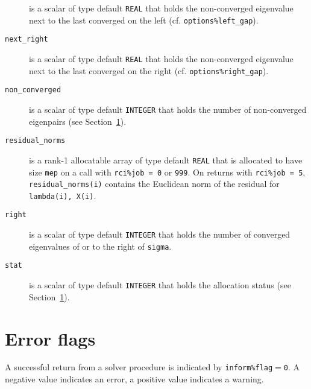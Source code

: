 \begin{description}
is a scalar of type default {\tt REAL} that holds
the non-converged eigenvalue next to the last converged on the left
(cf. {\tt options\%left\_gap}).
%
\item[\texttt{next\_right}]
is a scalar of type default {\tt REAL} that holds
the non-converged eigenvalue next to the last converged on the right
(cf. {\tt options\%right\_gap}).
%
\item[\texttt{non\_converged}]
is a scalar of type default \texttt{INTEGER}
that holds the number of non-converged eigenpairs
(see Section~\ref{ssmfe_expert:errors}).
%
\item[\texttt{residual\_norms}] is a rank-1 allocatable array of type
default {\tt REAL} that is allocated to have size {\tt mep} 
on a call with {\tt rci\%job = 0} or {\tt 999}.
On returns with 
{\tt rci\%job = 5},
{\tt residual\_norms(i)} 
contains the Euclidean norm of the residual
for {\tt lambda(i), X(i)}.
%
\item[\texttt{right}]
is a scalar of type default \texttt{INTEGER}
that holds the number of converged eigenvalues 
of  or 
to the right of {\tt sigma}.
%
\item[\texttt{stat}]
is a scalar of type default \texttt{INTEGER}
that holds the allocation status
(see Section~\ref{ssmfe_expert:errors}).
%
\end{description}

\section{Error flags}

\label{ssmfe_expert:errors}

A successful return from
a solver procedure
is indicated 
by {\tt inform\%flag$=$0}.
A negative value indicates an error, a positive value indicates a warning.

